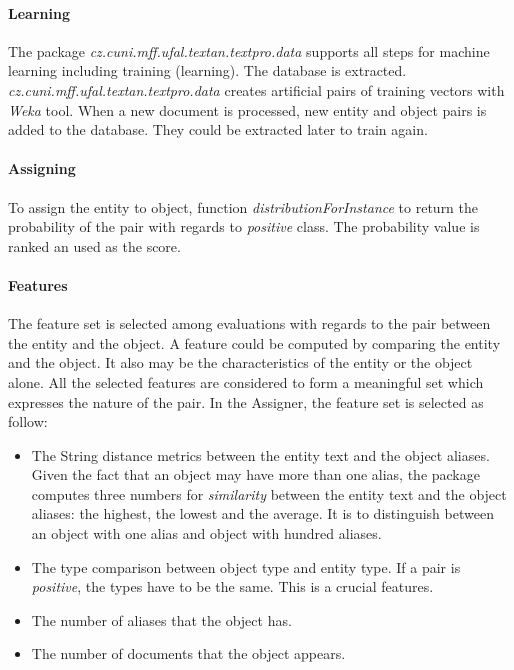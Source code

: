 \paragraph{Learning}
The package \emph{cz.cuni.mff.ufal.textan.textpro.data} supports all steps for machine
learning including training (learning). The database is extracted. 
\emph{cz.cuni.mff.ufal.textan.textpro.data} creates 
artificial pairs of training vectors with \textit{Weka} tool. When a new document is
processed, new entity and object pairs is added to the database. They could be extracted
later to train again.

\paragraph{Assigning}
To assign the entity to object, function \emph{distributionForInstance} to return the 
probability of the pair with regards to \emph{positive} class. The probability value 
is ranked an used as the score.


\paragraph{Features}

The feature set is selected among evaluations with regards to the pair between
the entity and the object. A feature could be computed by comparing the entity 
and the object. It also may be the characteristics of the entity or the object 
alone. All the selected features are considered to form a meaningful set which
expresses the nature of the pair. In the Assigner, the feature set is selected 
as follow:

\begin{itemize}
\item The String distance metrics between the entity text and the object aliases. Given 
the fact that an object may have more than one alias, the package computes three numbers for 
\textit{similarity} between the entity text and the object aliases: the highest, the lowest and
the average. It is to distinguish between an object with one alias and object with hundred aliases.
\item The type comparison between object type and entity type. If a pair is \textit{positive},
the types have to be the same. This is a crucial features. 
\item The number of aliases that the object has.
\item The number of documents that the object appears.  
\end{itemize}


